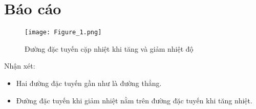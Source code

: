 \section{Báo cáo}
\begin{figure}[ht]
	\centering
	\texttt{[image: Figure\_1.png]}
	\caption{Đường đặc tuyến cặp nhiệt khi tăng và giảm nhiệt độ}
\end{figure}

Nhận xét:
\begin{itemize}
	\item Hai đường đặc tuyến gần như là đường thẳng.
	\item Đường đặc tuyến khi giảm nhiệt nằm trên đường đặc tuyến khi tăng nhiệt.
\end{itemize}